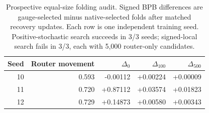 \begin{table}[t]
\centering\small
\caption{Prospective equal-size folding audit. Signed BPB differences are gauge-selected minus native-selected folds after matched recovery updates. Each row is one independent training seed. Positive-stochastic search succeeds in 3/3 seeds; signed-local search fails in 3/3, each with 5,000 router-only candidates.}
\label{tab:enhanced-decisions}
\begin{tabular}{rrrrr}
\toprule
Seed & Router movement & $\Delta_0$ & $\Delta_{100}$ & $\Delta_{500}$ \\
\midrule
10 & 0.593 & -0.00112 & +0.00224 & +0.00009 \\
11 & 0.720 & +0.87112 & +0.03574 & +0.01823 \\
12 & 0.729 & +0.14873 & +0.00580 & +0.00343 \\
\bottomrule
\end{tabular}
\end{table}
